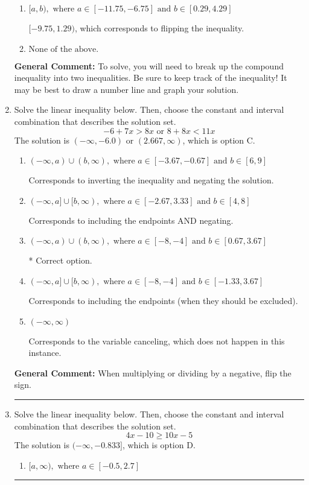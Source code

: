 \documentclass{extbook}[14pt]
\newcommand{\litem}[1]{\item #1

\rule{\textwidth}{0.4pt}}
\begin{document}
\begin{enumerate}
{\begin{enumerate}[label=\Alph*.]
* $(-9.75, 1.29]$, which is the correct option.
\item \( [a, b), \text{ where } a \in [-11.75, -6.75] \text{ and } b \in [0.29, 4.29] \)

$[-9.75, 1.29)$, which corresponds to flipping the inequality.
\item \( \text{None of the above.} \)


\end{enumerate}

\textbf{General Comment:} To solve, you will need to break up the compound inequality into two inequalities. Be sure to keep track of the inequality! It may be best to draw a number line and graph your solution.
}
\litem{
Solve the linear inequality below. Then, choose the constant and interval combination that describes the solution set.
\[ -6 + 7 x > 8 x \text{ or } 8 + 8 x < 11 x \]The solution is \( (-\infty, -6.0) \text{ or } (2.667, \infty) \), which is option C.\begin{enumerate}[label=\Alph*.]
\item \( (-\infty, a) \cup (b, \infty), \text{ where } a \in [-3.67, -0.67] \text{ and } b \in [6, 9] \)

Corresponds to inverting the inequality and negating the solution.
\item \( (-\infty, a] \cup [b, \infty), \text{ where } a \in [-2.67, 3.33] \text{ and } b \in [4, 8] \)

Corresponds to including the endpoints AND negating.
\item \( (-\infty, a) \cup (b, \infty), \text{ where } a \in [-8, -4] \text{ and } b \in [0.67, 3.67] \)

 * Correct option.
\item \( (-\infty, a] \cup [b, \infty), \text{ where } a \in [-8, -4] \text{ and } b \in [-1.33, 3.67] \)

Corresponds to including the endpoints (when they should be excluded).
\item \( (-\infty, \infty) \)

Corresponds to the variable canceling, which does not happen in this instance.
\end{enumerate}

\textbf{General Comment:} When multiplying or dividing by a negative, flip the sign.
}
\litem{
Solve the linear inequality below. Then, choose the constant and interval combination that describes the solution set.
\[ 4x -10 \geq 10x -5 \]The solution is \( (-\infty, -0.833] \), which is option D.\begin{enumerate}[label=\Alph*.]
\item \( [a, \infty), \text{ where } a \in [-0.5, 2.7] \)


\end{enumerate}}
\end{enumerate}
\end{document}
